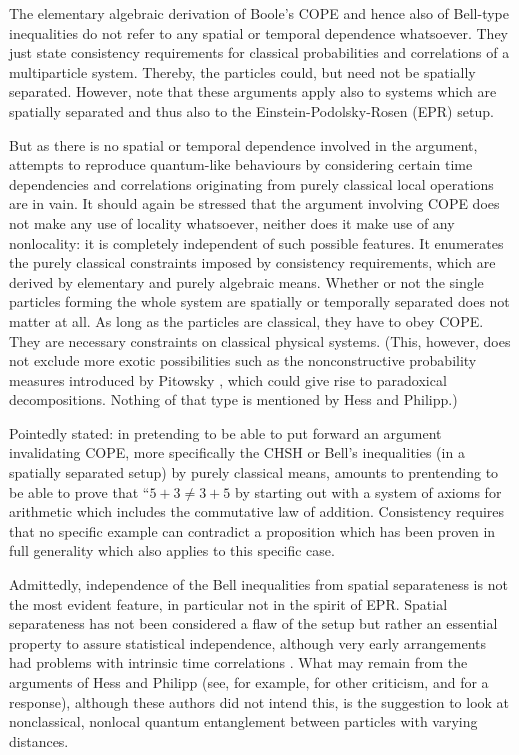 \documentclass{epl}
\begin{document}
The elementary algebraic derivation of
Boole's COPE and hence also of Bell-type inequalities do not refer to any spatial or temporal dependence whatsoever.
They just state consistency requirements for classical probabilities
and correlations of a multiparticle system.
Thereby, the particles could, but need not be spatially separated.
However, note that these arguments apply also to systems which are spatially separated and thus also
to the Einstein-Podolsky-Rosen (EPR) setup.

But as there is no spatial or temporal dependence involved in the argument, attempts to reproduce
quantum-like behaviours by considering certain time dependencies and correlations
originating from purely classical local operations are in vain.
It should again be stressed that the argument involving COPE does not make any use of locality whatsoever,
neither does it make use of any nonlocality: it is completely independent of such possible features.
It enumerates the purely classical constraints imposed by consistency requirements,
which are derived by elementary and purely algebraic means.
Whether or not the single particles forming the whole system are spatially or temporally separated
does not matter at all.
As long as the particles are classical, they have to obey COPE.
They are necessary constraints on classical physical systems.
(This, however, does not exclude more exotic possibilities such as
the nonconstructive probability measures introduced by Pitowsky \cite{pitowsky-82},
which could give rise to paradoxical decompositions.
Nothing of that type is mentioned by  Hess and Philipp.)

Pointedly stated: in pretending to be able to put forward an argument
invalidating COPE, more specifically the CHSH or Bell's inequalities (in a spatially separated setup) by
purely classical means, amounts to prentending to be able to prove that ``$5+3\neq 3+5$ by
starting out with a system of axioms for arithmetic which includes the commutative law of addition.
Consistency requires that no specific example can contradict
a proposition which has been proven in full generality which also applies to this specific case.



Admittedly, independence of the Bell inequalities from spatial separateness is not
the most evident feature, in particular not in the spirit of EPR.
Spatial separateness has not been considered a flaw
of the setup but rather an essential property to assure statistical independence,
although  very early arrangements
had problems with intrinsic time correlations \cite{zeilinger-86}.
What may remain from the arguments of
Hess and Philipp
(see, for example, \cite{Gill-Weihs-Z-Z,Mermin-2002}
for other criticism, and  \cite{Hess&Philipp2002a} for a response), although these authors did not intend this,
is the suggestion to look at nonclassical, nonlocal quantum entanglement
between particles  with varying distances.
\end{document}
